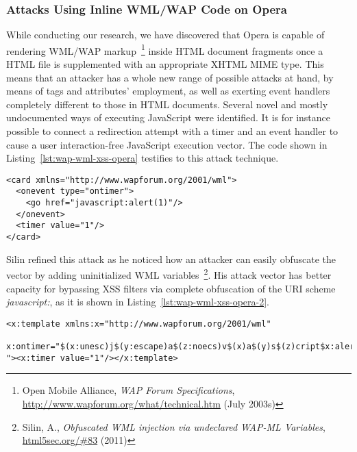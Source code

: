     \subsubsection{Attacks Using Inline WML/WAP Code on Opera}
    \label{subsubsec:5.4.13.1.attacks_using_inline_wap_code_on_opera}

    While conducting our research, we have discovered that Opera is capable of rendering WML/WAP markup~\footnote{Open Mobile Alliance, \textit{WAP Forum Specifications}, \url{http://www.wapforum.org/what/technical.htm} (July 2003s)} inside HTML document fragments once a HTML file is supplemented with an appropriate XHTML MIME type. This means that an attacker has a whole new range of possible attacks at hand, by means of tags and attributes' employment, as well as exerting event handlers completely different to those in HTML documents. Several novel and mostly undocumented ways of executing JavaScript were identified. It is for instance possible to connect a redirection attempt with a timer and an event handler to cause a user interaction-free JavaScript execution vector. The code shown in Listing~\ref{lst:wap-wml-xss-opera} testifies to this attack technique. 
  
\begin{lstlisting}[captionpos=b,label=lst:wap-wml-xss-opera,caption=Executing JavaScript via WAP/WML]
<card xmlns="http://www.wapforum.org/2001/wml">
  <onevent type="ontimer">
    <go href="javascript:alert(1)"/>
  </onevent>
  <timer value="1"/>
</card>   
\end{lstlisting}

    Silin refined this attack as he noticed how an attacker can easily obfuscate the vector by adding uninitialized WML variables~\footnote{Silin, A., \textit{Obfuscated WML injection via undeclared WAP-ML Variables}, \url{html5sec.org/#83} (2011)}.
    His attack vector has better capacity for bypassing XSS filters via complete obfuscation of the URI scheme \textit{javascript:}, as it is shown in Listing~\ref{lst:wap-wml-xss-opera-2}.

\begin{lstlisting}[captionpos=b,label=lst:wap-wml-xss-opera-2,caption=Attack vector obfuscation via WAP/WML]
<x:template xmlns:x="http://www.wapforum.org/2001/wml" 
  x:ontimer="$(x:unesc)j$(y:escape)a$(z:noecs)v$(x)a$(y)s$(z)cript$x:alert(1)
"><x:timer value="1"/></x:template>  
\end{lstlisting}
    
